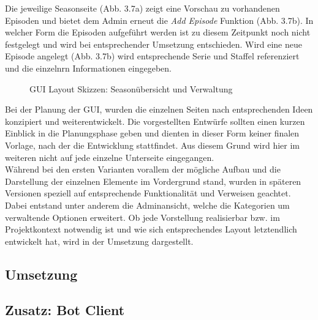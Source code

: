 Die jeweilige Seasonseite (Abb. 3.7a) zeigt eine Vorschau zu vorhandenen Episoden und bietet dem Admin erneut die \textit{Add Episode} Funktion (Abb. 3.7b). In welcher Form die Episoden aufgeführt werden ist zu diesem Zeitpunkt noch nicht festgelegt und wird bei entsprechender Umsetzung entschieden. Wird eine neue Episode angelegt (Abb. 3.7b) wird entsprechende Serie und Staffel referenziert und die einzelnrn Informationen eingegeben.\\
\begin{figure} [h!]
\centering
\hfill %
\hfill %
\hfill %
\caption{GUI Layout Skizzen: Seasonübersicht und Verwaltung }
\label{gui-skizzen-season-verwaltung}
\end{figure}

Bei der Planung der GUI, wurden die einzelnen Seiten nach entsprechenden Ideen konzipiert und weiterentwickelt. Die vorgestellten Entwürfe sollten einen kurzen Einblick in die Planungsphase geben und dienten in dieser Form keiner finalen Vorlage, nach der die Entwicklung stattfindet. Aus diesem Grund wird hier im weiteren nicht auf jede einzelne Unterseite eingegangen.\\ Während bei den ersten Varianten vorallem der mögliche Aufbau und die Darstellung der einzelnen Elemente im Vordergrund stand, wurden in späteren Versionen speziell auf entsprechende Funktionalität und Verweisen geachtet. Dabei entstand unter anderem die Adminansicht, welche die Kategorien um verwaltende Optionen erweitert. Ob jede Vorstellung realisierbar bzw. im Projektkontext notwendig ist und wie sich entsprechendes Layout letztendlich entwickelt hat, wird in der Umsetzung dargestellt.\\

\newpage
\subsection{Umsetzung}

\newpage

\subsection{Zusatz: Bot Client}
